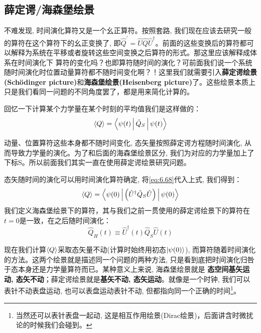 \documentclass[a4paper,zihao=-4,linespread=1]{ctexrep}
\begin{document}
    \subsection{薛定谔/海森堡绘景}
    不难发现, 时间演化算符又是一个幺正算符。按照套路, 我们现在应该去研究一般的算符在这个算符下的幺正变换了, 即$\hat Q^\prime=\hat{U}\hat{Q}\hat{U}^\dagger$。前面的这些变换后的算符都可以解释为系统在平移或者旋转这些空间变换之后算符的形式。那这里应该解释成体系在时间演化下
    算符的变化吗？也即算符随时间的演化？可前面我们说一个系统随时间演化时位置动量算符都不随时间变化啊？！这里我们就需要引入\textbf{薛定谔绘景(Sch\"odinger picture)}和\textbf{海森堡绘景(Heisenberg picture)}了。这些绘景本质上只是我们看同一问题的不同角度罢了，都是用来简化计算的。
    
%    
    回忆一下计算某个力学量在某个时刻的平均值我们是这样做的：
    \[\braket{Q}=\Braket{\psi(t)|\hat{Q}_S|\psi(t)}\]
    
    动量、位置算符这些本身都不随时间变化, 态矢量按照薛定谔方程随时间演化, 从而导致力学量的演化。为了和后面的海森堡绘景区分, 我们为对应的力学量加上了下标S。所以前面我们其实一直在使用薛定谔绘景研究问题。

    态矢随时间的演化可以用时间演化算符确定, 将\ref{eq:6.68}代入上式, 我们得到：
    \[\braket{Q}=\Braket{\psi(0)|\left(\hat{U}^\dagger\hat{Q}_S\hat{U}\right)|\psi(0)}\]
    我们定义海森堡绘景下的算符，其与我们之前一贯使用的薛定谔绘景下的算符在$t=0$是一致，在之后随时间演化：
    \begin{equation}
        \label{eq:6.71}
        \boxed{
        \hat{Q}_H(t)\equiv\hat{U}^\dagger(t)\hat{Q}_S\hat{U}(t)}
    \end{equation}
    
    现在我们计算$\braket{Q}$采取态矢量不动(计算时始终用初态$\ket{\psi(0)}$), 而算符随着时间演化的方法。这两个绘景就是描述同一个问题的两种方法, 只是看到底把时间演化归咎于态本身还是力学量算符而已。某种意义上来说, 海森堡绘景就是
    \textbf{态空间基矢运动, 态矢不动}；薛定谔绘景就是\textbf{基矢不动, 态矢运动}。就像是一个时钟, 我们可以表针不动表盘运动, 也可以表盘运动表针不动, 但都指向同一个正确的时间\footnote{当然还可以表针表盘一起动, 这是相互作用绘景(Dirac绘景)，后面讲含时微扰论的时候我们会碰到。}。
    
\end{document}
